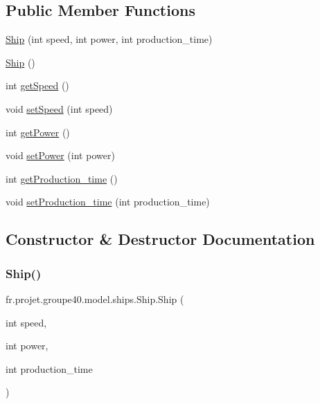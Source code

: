 \subsection*{Public Member Functions}
\begin{DoxyCompactItemize}
\item 
\hyperlink{classfr_1_1projet_1_1groupe40_1_1model_1_1ships_1_1_ship_ab0ceda4452b34d91f77ecf1a3275d182}{Ship} (int speed, int power, int production\+\_\+time)
\item 
\hyperlink{classfr_1_1projet_1_1groupe40_1_1model_1_1ships_1_1_ship_a2c31827efa3141409391f989e60aca58}{Ship} ()
\item 
int \hyperlink{classfr_1_1projet_1_1groupe40_1_1model_1_1ships_1_1_ship_ac8116629f4490bf3dcac06fb43036b1c}{get\+Speed} ()
\item 
void \hyperlink{classfr_1_1projet_1_1groupe40_1_1model_1_1ships_1_1_ship_a1e9f20684a7337428f3eeba2751b3c9a}{set\+Speed} (int speed)
\item 
int \hyperlink{classfr_1_1projet_1_1groupe40_1_1model_1_1ships_1_1_ship_a1740ea91dcc786208350a3125a7acfd3}{get\+Power} ()
\item 
void \hyperlink{classfr_1_1projet_1_1groupe40_1_1model_1_1ships_1_1_ship_abdfeb45c897cf6b31d8236f9e4e881f7}{set\+Power} (int power)
\item 
int \hyperlink{classfr_1_1projet_1_1groupe40_1_1model_1_1ships_1_1_ship_af207f2465b91217a5b178b27fa2351aa}{get\+Production\+\_\+time} ()
\item 
void \hyperlink{classfr_1_1projet_1_1groupe40_1_1model_1_1ships_1_1_ship_a1d404e1bedd38ad6a347862cb518927d}{set\+Production\+\_\+time} (int production\+\_\+time)
\end{DoxyCompactItemize}


\subsection{Constructor \& Destructor Documentation}
\mbox{\label{classfr_1_1projet_1_1groupe40_1_1model_1_1ships_1_1_ship_ab0ceda4452b34d91f77ecf1a3275d182}} 
\subsubsection{\texorpdfstring{Ship()}{Ship()}\hspace{0.1cm}{\footnotesize\ttfamily [1/2]}}
{\footnotesize\ttfamily fr.\+projet.\+groupe40.\+model.\+ships.\+Ship.\+Ship (\begin{DoxyParamCaption}\item[{int}]{speed,  }\item[{int}]{power,  }\item[{int}]{production\+\_\+time }\end{DoxyParamCaption})}

